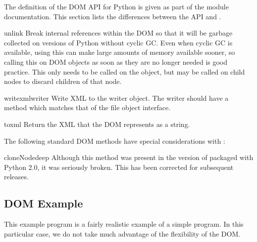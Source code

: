 The definition of the DOM API for Python is given as part of the
 module documentation.  This section lists the
differences between the API and .


\begin{methoddesc}{unlink}{}
Break internal references within the DOM so that it will be garbage
collected on versions of Python without cyclic GC.  Even when cyclic
GC is available, using this can make large amounts of memory available
sooner, so calling this on DOM objects as soon as they are no longer
needed is good practice.  This only needs to be called on the
 object, but may be called on child nodes to discard
children of that node.
\end{methoddesc}

\begin{methoddesc}{writexml}{writer}
Write XML to the writer object.  The writer should have a
 method which matches that of the file object
interface.
\end{methoddesc}

\begin{methoddesc}{toxml}{}
Return the XML that the DOM represents as a string.
\end{methoddesc}

The following standard DOM methods have special considerations with
:

\begin{methoddesc}{cloneNode}{deep}
Although this method was present in the version of
 packaged with Python 2.0, it was seriously
broken.  This has been corrected for subsequent releases.
\end{methoddesc}


\subsection{DOM Example \label{dom-example}}

This example program is a fairly realistic example of a simple
program. In this particular case, we do not take much advantage
of the flexibility of the DOM.

